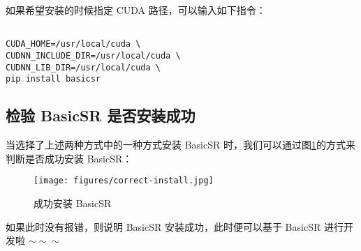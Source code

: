 \documentclass[../main.tex]{subfiles}
\begin{document}







如果希望安装的时候指定 CUDA 路径，可以输入如下指令：

\begin{verbatim}

CUDA_HOME=/usr/local/cuda \
CUDNN_INCLUDE_DIR=/usr/local/cuda \
CUDNN_LIB_DIR=/usr/local/cuda \
pip install basicsr

\end{verbatim}

\subsection{检验 BasicSR 是否安装成功}

当选择了上述两种方式中的一种方式安装 BasicSR 时，我们可以通过图\ref{fig:correct-install}的方式来判断是否成功安装 BasicSR：

    \begin{figure}[H]
	\begin{center}
		\texttt{[image: figures/correct-install.jpg]}
		\caption{成功安装 BasicSR}
		\label{fig:correct-install}
	\end{center}
	\vspace{-0.5cm}
    \end{figure}

如果此时没有报错，则说明 BasicSR 安装成功，此时便可以基于 BasicSR 进行开发啦 $\sim \sim \sim$

\end{document}

